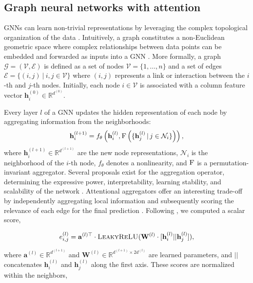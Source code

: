 \documentclass[a4paper,fleqn]{cas-sc}
\begin{document}
\subsection{Graph neural networks with attention}
GNNs can learn non-trivial representations by leveraging the complex topological organization of the data \cite{velivckovic2023everything,wu2019graphsurvey}. Intuitively, a graph constitutes a non-Euclidean geometric space where complex relationships between data points can be embedded and forwarded as inputs into a GNN \cite{BronsteinGeometricDL}. More formally, a graph $\mathcal{G} = (\mathcal{V}, \mathcal{E})$ is defined as a set of nodes $\mathcal{V} = \{1, \ldots, n\}$ and a set of edges $\mathcal{E} = \{(i,j) \ | \  i,j \in \mathcal{V}\}$ where $(i,j)$ represents a link or interaction between the $i$-th and $j$-th nodes. Initially, each node $i \in \mathcal{V}$ is associated with a column feature vector $\mathbf{h}_{i}^{(0)} \in \mathbb{R}^{d^{(0)}}$.

Every layer $l$ of a GNN updates the hidden representation of each node by aggregating information from the neighborhoods: 
\begin{equation} \label{layer}
    \mathbf{h}_{i}^{(l+1)} = f_{\theta} \left( \mathbf{h}_i^{(l)}, \textsc{F} \left( \{ \mathbf{h}^{(l)}_j \, | \, j \in \mathcal{N}_i \} \right) \right),
\end{equation}
where $\textbf{h}_{i}^{(l+1)} \in \mathbb{R}^{d^{(l+1)}}$ are the new node representations, $\mathcal{N}_i$ is the neighborhood of the $i$-th node, $f_{\theta}$ denotes a nonlinearity, and $\textsc{F}$ is a permutation-invariant aggregator. Several proposals exist for the aggregation operator, determining the expressive power, interpretability, learning stability, and scalability of the network \cite{velivckovic2023everything}. Attentional aggregators offer an interesting trade-off by independently aggregating local information and subsequently scoring the relevance of each edge for the final prediction \cite{velickovic2018graph}. Following \cite{brody2021gatv2}, we computed a scalar score,

\begin{equation} \label{score_e}
    e_{i,j}^{(l)} = \mathbf{a}^{(l)\top}  \cdot \textsc{LeakyReLU}(\mathbf{W}^{(l)} \cdot [\mathbf{h}_{i}^{(l)} || \mathbf{h}_{j}^{(l)}]),
\end{equation} 

where $\mathbf{a}^{(l)} \in \mathbb{R}^{d^{(l+1)}}$ and $\mathbf{W}^{(l)} \in \mathbb{R}^{d^{(l+1)} \times 2d^{(l)}}$ are learned parameters, and $||$ concatenates $\mathbf{h}_{i}^{(l)}$ and $\mathbf{h}_{j}^{(l)}$ along the first axis. These scores are normalized within the neighbors,
\end{document}

